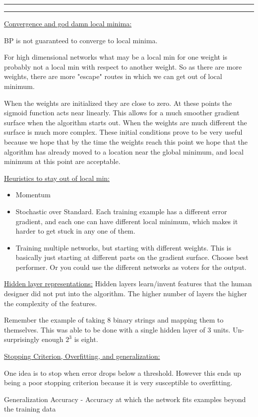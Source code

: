 \documentclass[11pt]{article}
\newcounter{questionCounter}
\newcounter{partCounter}[questionCounter]
\newenvironment{question}[2][\arabic{questionCounter}]{%
    \addtocounter{questionCounter}{1}%
    \setcounter{partCounter}{0}%
    \vspace{.25in} \hrule \vspace{0.5em}%
        \noindent{\bf #1: #2}%
    \vspace{0.8em} \hrule \vspace{.10in}%
}{}
\begin{document}
\begin{question}{Artificial Neural Networks: }
\underline{Convergence and god damn local minima:}

BP is not guaranteed to converge to local minima.

For high dimensional networks what may be a local min for one weight is probably not a local
min with respect to another weight. So as there are more weights, there are more "escape" routes
in which we can get out of local minimum. 

When the weights are initialized they are close to zero. At these points the sigmoid function
acts near linearly. This allows for a much smoother gradient surface when the algorithm starts out. 
When the weights are much different the surface is much more complex. These initial conditions
prove to be very useful because we hope that by the time the weights reach this point we hope
that the algorithm has already moved to a location near the global minimum, and local minimum
at this point are acceptable.

\underline{Heuristics to stay out of local min:}
\begin{itemize}
    \item Momentum
    \item Stochastic over Standard. Each training example has a different error gradient, and each one
    can have different local minimum, which makes it harder to get stuck in any one of them.
    \item Training multiple networks, but starting with different weights. This is basically just
    starting at different parts on the gradient surface. Choose best performer. Or you could use
    the different networks as voters for the output.
\end{itemize}


\underline{Hidden layer representations:}
Hidden layers learn/invent features that the human designer did not put into the algorithm. The higher
number of layers the higher the complexity of the features.

Remember the example of taking 8 binary strings and mapping them to themselves. This was able to be done
with a single hidden layer of 3 units. Un-surprisingly enough $2^3$ is eight.

\underline{Stopping Criterion, Overfitting, and generalization:}

One idea is to stop when error drops below a threshold. However this ends up being a poor stopping criterion
because it is very susceptible to overfitting.

Generalization Accuracy - Accuracy at which the network fits examples beyond the training data


\end{question}
\end{document}
